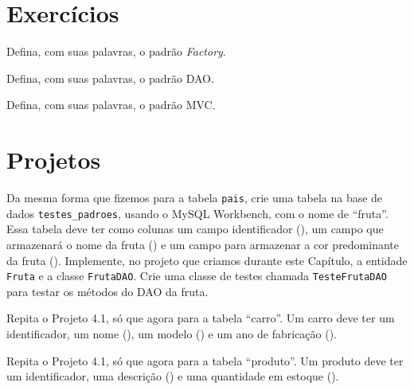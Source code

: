 \section{Exercícios}

\begin{exercicioSemArquivo}{}{}{}
    Defina, com suas palavras, o padrão \textit{Factory}.
\end{exercicioSemArquivo}

\begin{exercicioSemArquivo}{}{}{}
    Defina, com suas palavras, o padrão DAO.
\end{exercicioSemArquivo}

\begin{exercicioSemArquivo}{}{}{}
    Defina, com suas palavras, o padrão MVC.
\end{exercicioSemArquivo}


\section{Projetos}

\begin{projetoSemArquivo}{}{}{}
    Da mesma forma que fizemos para a tabela \texttt{pais}, crie uma tabela na base de dados \texttt{testes\_padroes}, usando o MySQL Workbench, com o nome de ``fruta''. Essa tabela deve ter como colunas um campo identificador (), um campo que armazenará o nome da fruta () e um campo para armazenar a cor predominante da fruta (). Implemente, no projeto que criamos durante este Capítulo, a entidade \texttt{Fruta} e a classe \texttt{FrutaDAO}. Crie uma classe de testes chamada \texttt{TesteFrutaDAO} para testar os métodos do DAO da fruta. 
\end{projetoSemArquivo}

\begin{projetoSemArquivo}{}{}{}
    Repita o Projeto 4.1, só que agora para a tabela ``carro''. Um carro deve ter um identificador, um nome (), um modelo () e um ano de fabricação ().
\end{projetoSemArquivo}

\begin{projetoSemArquivo}{}{}{}
    Repita o Projeto 4.1, só que agora para a tabela ``produto''. Um produto deve ter um identificador, uma descrição () e uma quantidade em estoque ().
\end{projetoSemArquivo}


